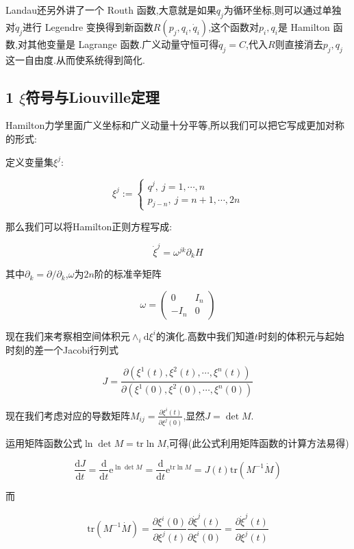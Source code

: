 \documentclass[UTF8]{article}
\newcommand{\D}{\mathrm{d}}
\newcommand{\E}{\mathrm{e}}
\begin{document}
	Landau还另外讲了一个 Routh 函数,大意就是如果$q_{j}$为循环坐标,则可以通过单独对$\dot{q}_{j}$进行 Legendre 变换得到新函数$R(p_{j},q_{i},\dot{q}_{i})
	$,这个函数对$p_{i},q_{i}$是 Hamilton 函数,对其他变量是 Lagrange 函数.广义动量守恒可得$\dot{q}_{j}=C$,代入$R$则直接消去$p_{j},q_{j}$这一自由度.从而使系统得到简化.
	
	
	
	\newpage

\subsection*{1 $\xi$符号与Liouville定理}

	Hamilton力学里面广义坐标和广义动量十分平等,所以我们可以把它写成更加对称的形式:
	
	定义变量集$\xi^{j}$:
	
	\[\xi^{j} := 
	\begin{cases}
		q^{j},~j = 1,\cdots,n\\
		p_{j-n},~j = n + 1,\cdots,2n
	\end{cases}\]

	那么我们可以将Hamilton正则方程写成:
	
	\[\dot{\xi}^{j} = \omega^{jk} \partial_{k}H\]
	
	其中$\partial_{k} = \partial / \partial_{k}$,$\omega$为$2n$阶的标准辛矩阵
	
	\[\omega = \begin{pmatrix}0&I_{n}\\-I_{n}&0\end{pmatrix}\]
	
	现在我们来考察相空间体积元$\wedge_{i} \D \xi^{i}$的演化.高数中我们知道$t$时刻的体积元与起始时刻的差一个Jacobi行列式
	
	\[J = \frac{\partial (\xi^{1}(t),\xi^{2}(t),\cdots,\xi^{n}(t))}{\partial (\xi^{1}(0),\xi^{2}(0),\cdots,\xi^{n}(0))}\]
	
	现在我们考虑对应的导数矩阵$M_{ij} = \frac{\partial \xi^{i}(t)}{\partial \xi^{j}(0)}$,显然$J = \det M$.
	
	运用矩阵函数公式$\ln \det M = \mathrm{tr} \ln M$,可得(此公式利用矩阵函数的计算方法易得)
	
	\[\frac{\D J}{\D t} = \frac{\D}{\D t} \E^{\ln \det M} = \frac{\D}{\D t} \E^{\mathrm{tr} \ln M} = J(t) \mathrm{tr} (M^{-1}\dot{M})\]
	
	而
	
	\[\mathrm{tr} (M^{-1}\dot{M}) = \frac{\partial \xi^{i}(0)}{\partial \xi^{j}(t)}\frac{\partial \dot{\xi}^{j}(t)}{\partial \xi^{i}(0)} = \frac{\partial \dot{\xi}^{j}(t)}{\partial \xi^{j}(t)}\]
\end{document}
